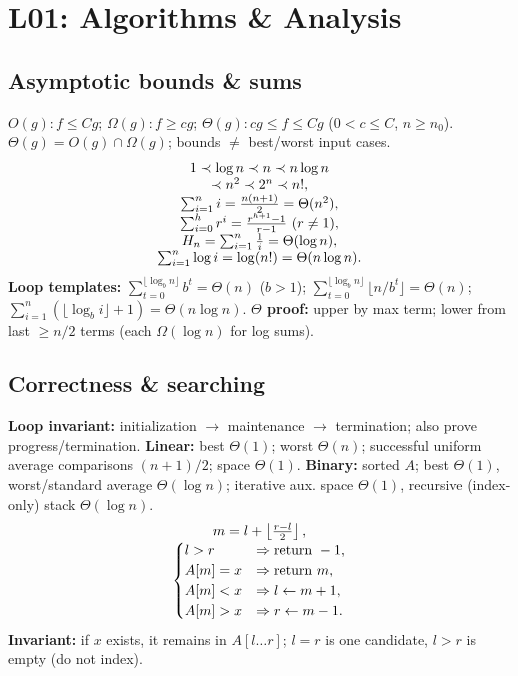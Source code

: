 \section{L01: Algorithms \& Analysis}
\subsection{Asymptotic bounds \& sums}
$O(g):f\le Cg$; $\Omega(g):f\ge cg$;
$\Theta(g):cg\le f\le Cg$ ($0<c\le C$, $n\ge n_0$).
$\Theta(g)=O(g)\cap\Omega(g)$; bounds $\ne$ best/worst input cases.
\[
\begin{array}{@{}c@{}}
1\prec\log n\prec n\prec n\log n\\
\prec n^2\prec 2^n\prec n!,\\
\sum_{i=1}^ni=\frac{n(n+1)}2=\Theta(n^2),\\
\sum_{i=0}^{h}r^i=\frac{r^{h+1}-1}{r-1}\ (r\ne1),\\
H_n=\sum_{i=1}^n\frac1i=\Theta(\log n),\\
\sum_{i=1}^n\log i=\log(n!)=\Theta(n\log n).
\end{array}
\]
\textbf{Loop templates:}
$\sum_{t=0}^{\lfloor\log_b n\rfloor}b^t=\Theta(n)$ ($b>1$);
$\sum_{t=0}^{\lfloor\log_b n\rfloor}\lfloor n/b^t\rfloor=\Theta(n)$;
$\sum_{i=1}^n(\lfloor\log_b i\rfloor+1)=\Theta(n\log n)$.
\textbf{$\Theta$ proof:} upper by max term; lower from last $\ge n/2$ terms (each $\Omega(\log n)$ for log sums).

\subsection{Correctness \& searching}
\textbf{Loop invariant:} initialization $\to$ maintenance $\to$ termination; also prove progress/termination.
\textbf{Linear:} best $\Theta(1)$; worst $\Theta(n)$; successful uniform average comparisons $(n+1)/2$; space $\Theta(1)$.
\textbf{Binary:} sorted $A$; best $\Theta(1)$, worst/standard average $\Theta(\log n)$; iterative aux. space $\Theta(1)$, recursive (index-only) stack $\Theta(\log n)$.
\[
\begin{array}{@{}c@{}}
m=l+\left\lfloor\frac{r-l}{2}\right\rfloor,\\
\begin{cases}
l>r&\Rightarrow\text{return }-1,\\
A[m]=x&\Rightarrow\text{return }m,\\
A[m]<x&\Rightarrow l\gets m+1,\\
A[m]>x&\Rightarrow r\gets m-1.
\end{cases}
\end{array}
\]
\textbf{Invariant:} if $x$ exists, it remains in $A[l\ldots r]$;
$l=r$ is one candidate, $l>r$ is empty (do not index).

